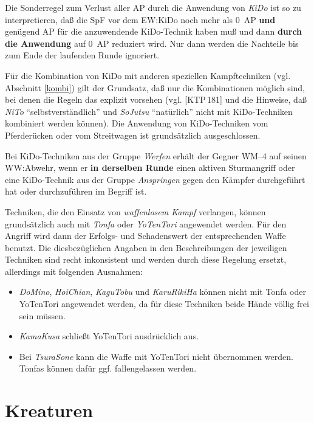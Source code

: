 \documentclass[10pt,a4paper,germanpar]{article}
\begin{document}
Die Sonderregel zum Verlust aller AP durch die Anwendung von
\emph{KiDo} ist so zu interpretieren, daß die SpF vor dem EW:KiDo noch
mehr als 0~AP \textbf{und} genügend AP für die anzuwendende
KiDo-Technik haben muß und dann \textbf{durch die Anwendung} auf 0~AP
reduziert wird. Nur dann werden die Nachteile bis zum Ende der
laufenden Runde ignoriert.

Für die Kombination von KiDo mit anderen speziellen Kampftechniken
(vgl. Abschnitt \ref{kombi}) gilt der Grundsatz, daß nur die
Kombinationen möglich sind, bei denen die Regeln das explizit vorsehen
(vgl. [KTP\,181] und die Hinweise, daß \emph{NiTo}
"`selbstverständlich"' und \emph{SoJutsu} "`natürlich"' nicht mit
KiDo-Techniken kombiniert werden können). Die Anwendung von
KiDo-Techniken vom Pferderücken oder vom Streitwagen ist grundsätzlich
ausgeschlossen.

Bei KiDo-Techniken aus der Gruppe \emph{Werfen} erhält der Gegner
WM--4 auf seinen WW:Abwehr, wenn er \textbf{in derselben Runde} einen
aktiven Sturmangriff oder eine KiDo-Technik aus der Gruppe
\emph{Anspringen} gegen den Kämpfer durchgeführt hat oder
durchzuführen im Begriff ist.

Techniken, die den Einsatz von \emph{waffenlosem Kampf} verlangen,
können grundsätzlich auch mit \emph{Tonfa} oder \emph{YoTenTori}
angewendet werden. Für den Angriff wird dann der Erfolgs- und
Schadenswert der entsprechenden Waffe benutzt. Die diesbezüglichen
Angaben in den Beschreibungen der jeweiligen Techniken sind recht
inkonsistent und werden durch diese Regelung ersetzt, allerdings mit
folgenden Ausnahmen:
\begin{itemize}
\item \emph{DoMino}, \emph{HoiChian}, \emph{KaguTobu} und
  \emph{KaruRikiHa} können nicht mit Tonfa oder YoTenTori angewendet
  werden, da für diese Techniken beide Hände völlig frei sein müssen.
\item \emph{KamaKusa} schließt YoTenTori ausdrücklich aus.
\item Bei \emph{TsuraSone} kann die Waffe mit YoTenTori nicht
  übernommen werden. Tonfas können dafür ggf. fallengelassen werden.
\end{itemize}

\section{Kreaturen}
\end{document}
